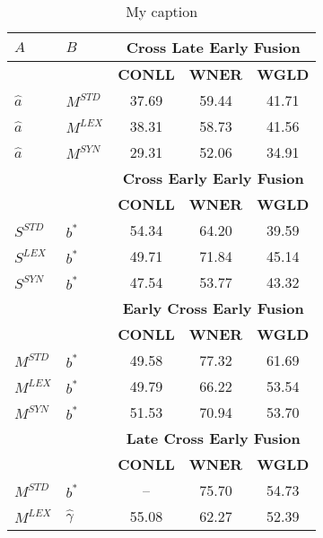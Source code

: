 \begin{table}[]
\centering
\begin{minipage}{0.48\textwidth}
\centering
\caption{My caption}
\begin{tabular}{@{}llccc@{}}
	\toprule
	$A$                      & $B$            & \multicolumn{3}{c}{\textbf{Cross Late Early Fusion}}  \\ \midrule
	                         &                & \textbf{CONLL} & \textbf{WNER}  &             \textbf{WGLD}             \\
	\cmidrule{3-5}
$\hat{a}$ & $M^{STD}$      & 37.69 & 59.44 &            41.71             \\
	$\hat{a}$                & $M^{LEX}$      & 38.31 & 58.73 &            41.56             \\
	$\hat{a}$                & $M^{SYN}$      & 29.31 & 52.06 &            34.91             \\ \midrule
	                         &                & \multicolumn{3}{c}{\textbf{Cross Early Early Fusion}} \\ \midrule
	                         &                & \textbf{CONLL} & \textbf{WNER}  &             \textbf{WGLD}             \\
	\cmidrule{3-5}
$S^{STD}$ & $b^*$          &   54.34    &    64.20   & 39.59 \\
	$S^{LEX}$                & $b^*$          &  49.71     &   71.84    &  45.14\\
	$S^{SYN}$                & $b^*$          &  47.54     &   53.77    & 43.32 \\ \midrule
	                         &                & \multicolumn{3}{c}{\textbf{Early Cross Early Fusion}} \\ \midrule
	                         &                & \textbf{CONLL} & \textbf{WNER}  &             \textbf{WGLD}             \\
	\cmidrule{3-5}
$M^{STD}$ & $b^*$          & 49.58 & 77.32 &            61.69             \\
	$M^{LEX}$                & $b^*$          & 49.79 & 66.22 &            53.54             \\
	$M^{SYN}$                & $b^*$          & 51.53 & 70.94 &            53.70             \\ \midrule
	                         &                & \multicolumn{3}{c}{\textbf{Late Cross Early Fusion}}  \\ \midrule
	                         &                & \textbf{CONLL} & \textbf{WNER}  &             \textbf{WGLD}             \\
	\cmidrule{3-5}
$M^{STD}$ & $b^*$          &  --   & 75.70 &            54.73             \\
	$M^{LEX}$                & $\hat{\gamma}$ & 55.08 & 62.27 &            52.39             \\ \bottomrule
\end{tabular}


\end{minipage}
\end{table}
